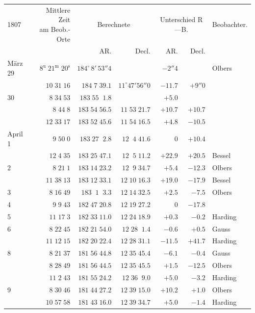 \begin{longtable}{l|r|r|r|r|r|l}
1807 & \shortstack{Mittlere Zeit\\am Beob.-Orte} & \multicolumn{2}{c|}{Berechnete} & \multicolumn{2}{c|}{Unterschied R—B.} & Beobachter. \\
& & AR. & Decl. & AR. & Decl. & \\ \hline
März 29 & $8^{\text{u}}\;21^{\text{m}}\;20^{\text{s}}$ & $184^\circ\,8'\,53''4$ &  & $-2''4$ &  & Olbers \\
 & $10\;31\;16$ & $184\;7\;39.1$ & $11^\circ 47' 56''0$ & $-11.7$ & $+9''0$ &  \\
30 & $8\;34\;53$ & $183\;55\;\;1.8$ &  & $+5.0$ &  &  \\
 & $8\;44\;8$ & $183\;54\;56.5$ & $11\;53\;21.7$ & $+10.7$ & $+10.7$ &  \\
 & $12\;33\;17$ & $183\;52\;45.6$ & $11\;54\;16.5$ & $+4.8$ & $-10.5$ &  \\
April 1 & $9\;50\;0$ & $183\;27\;\;2.8$ & $12\;\;4\;41.6$ & $0$ & $+10.4$ &  \\
 & $12\;4\;35$ & $183\;25\;47.1$ & $12\;\;5\;11.2$ & $+22.9$ & $+20.5$ & Bessel \\
2 & $8\;21\;1$ & $183\;14\;23.2$ & $12\;\;9\;34.7$ & $+5.4$ & $-12.3$ & Olbers \\
 & $11\;38\;13$ & $183\;12\;33.1$ & $12\;10\;16.3$ & $+19.0$ & $-17.9$ & Bessel \\
3 & $8\;16\;49$ & $183\;\;1\;\;3.3$ & $12\;14\;32.5$ & $+2.5$ & $-7.5$ & Olbers \\
4 & $9\;9\;43$ & $182\;47\;20.8$ & $12\;19\;27.2$ & $0$ & $-17.8$ &  \\
5 & $11\;17\;3$ & $182\;33\;11.0$ & $12\;24\;18.9$ & $+0.3$ & $-0.2$ & Harding \\
6 & $8\;22\;45$ & $182\;21\;54.0$ & $12\;28\;\;1.4$ & $-0.6$ & $+0.5$ & Gauss \\
 & $11\;12\;15$ & $182\;20\;22.4$ & $12\;28\;31.1$ & $-11.5$ & $+41.7$ & Harding \\
8 & $8\;21\;37$ & $181\;56\;44.8$ & $12\;35\;45.4$ & $-6.1$ & $-0.4$ & Gauss \\
 & $8\;28\;49$ & $181\;56\;44.5$ & $12\;35\;45.5$ & $+1.5$ & $-12.5$ & Olbers \\
 & $11\;2\;43$ & $181\;55\;24.2$ & $12\;36\;\;9.0$ & $+5.0$ & $-3.2$ & Harding \\
9 & $8\;30\;46$ & $181\;44\;27.2$ & $12\;39\;15.0$ & $+10.2$ & $+1.0$ & Olbers \\
 & $10\;57\;58$ & $181\;43\;16.0$ & $12\;39\;34.7$ & $+5.0$ & $-1.4$ & Harding \\

\end{longtable}
